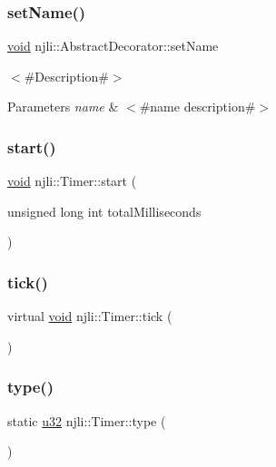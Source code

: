 \subsubsection{\texorpdfstring{set\+Name()}{setName()}}
{\footnotesize\ttfamily \mbox{\hyperlink{_thread_8h_af1e856da2e658414cb2456cb6f7ebc66}{void}} njli\+::\+Abstract\+Decorator\+::set\+Name}

$<$\#\+Description\#$>$


\begin{DoxyParams}{Parameters}
{\em name} & $<$\#name description\#$>$ \\
\hline
\end{DoxyParams}
\mbox{\label{classnjli_1_1_timer_a7b6b18b762f9037a0c45683f45961f5f}} 
\subsubsection{\texorpdfstring{start()}{start()}}
{\footnotesize\ttfamily \mbox{\hyperlink{_thread_8h_af1e856da2e658414cb2456cb6f7ebc66}{void}} njli\+::\+Timer\+::start (\begin{DoxyParamCaption}\item[{unsigned long int}]{total\+Milliseconds }\end{DoxyParamCaption})}

\mbox{\label{classnjli_1_1_timer_a3ae16ee82dd08e6584913ffc4c55793a}} 
\subsubsection{\texorpdfstring{tick()}{tick()}}
{\footnotesize\ttfamily virtual \mbox{\hyperlink{_thread_8h_af1e856da2e658414cb2456cb6f7ebc66}{void}} njli\+::\+Timer\+::tick (\begin{DoxyParamCaption}{ }\end{DoxyParamCaption})\hspace{0.3cm}{\ttfamily [virtual]}}

\mbox{\label{classnjli_1_1_timer_ad373f359bc83bdfe91103ecda0c6fad6}} 
\subsubsection{\texorpdfstring{type()}{type()}}
{\footnotesize\ttfamily static \mbox{\hyperlink{_util_8h_a10e94b422ef0c20dcdec20d31a1f5049}{u32}} njli\+::\+Timer\+::type (\begin{DoxyParamCaption}{ }\end{DoxyParamCaption})\hspace{0.3cm}{\ttfamily [static]}}

